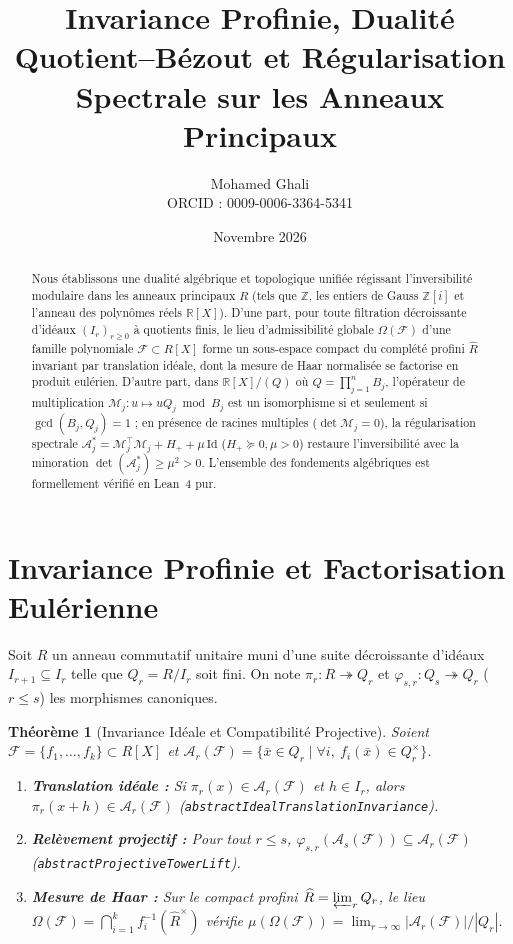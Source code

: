 \documentclass[11pt,a4paper]{article}
\title{\textbf{Invariance Profinie, Dualité Quotient--Bézout et Régularisation Spectrale sur les Anneaux Principaux}}
\author{Mohamed Ghali \\ \small ORCID : 0009-0006-3364-5341}
\date{Novembre 2026}
\newtheorem{theorem}{Théorème}[section]
\begin{document}
\maketitle

\begin{abstract}
Nous établissons une dualité algébrique et topologique unifiée régissant l'inversibilité modulaire dans les anneaux principaux $R$ (tels que $\mathbb{Z}$, les entiers de Gauss $\mathbb{Z}[i]$ et l'anneau des polynômes réels $\mathbb{R}[X]$). D'une part, pour toute filtration décroissante d'idéaux $(I_r)_{r \ge 0}$ à quotients finis, le lieu d'admissibilité globale $\Omega(\mathcal{F})$ d'une famille polynomiale $\mathcal{F} \subset R[X]$ forme un sous-espace compact du complété profini $\widehat{R}$ invariant par translation idéale, dont la mesure de Haar normalisée se factorise en produit eulérien. D'autre part, dans $\mathbb{R}[X]/(Q)$ où $Q = \prod_{j=1}^n B_j$, l'opérateur de multiplication $\mathcal{M}_j : u \mapsto u Q_j \bmod B_j$ est un isomorphisme si et seulement si $\gcd(B_j, Q_j) = 1$ ; en présence de racines multiples ($\det \mathcal{M}_j = 0$), la régularisation spectrale $\mathcal{A}_j^* = \mathcal{M}_j^\top \mathcal{M}_j + H_+ + \mu\,\mathrm{Id}$ ($H_+ \succeq 0, \mu > 0$) restaure l'inversibilité avec la minoration $\det(\mathcal{A}_j^*) \ge \mu^2 > 0$. L'ensemble des fondements algébriques est formellement vérifié en Lean~4 pur.
\end{abstract}

\section{Invariance Profinie et Factorisation Eulérienne}

Soit $R$ un anneau commutatif unitaire muni d'une suite décroissante d'idéaux $I_{r+1} \subseteq I_r$ telle que $Q_r = R/I_r$ soit fini. On note $\pi_r : R \twoheadrightarrow Q_r$ et $\varphi_{s,r} : Q_s \twoheadrightarrow Q_r$ ($r \le s$) les morphismes canoniques.

\begin{theorem}[Invariance Idéale et Compatibilité Projective]
Soient $\mathcal{F} = \{f_1, \dots, f_k\} \subset R[X]$ et $\mathcal{A}_r(\mathcal{F}) = \{ \bar{x} \in Q_r \mid \forall i,\ f_i(\bar{x}) \in Q_r^\times \}$.
\begin{enumerate}
    \item \textbf{Translation idéale :} Si $\pi_r(x) \in \mathcal{A}_r(\mathcal{F})$ et $h \in I_r$, alors $\pi_r(x + h) \in \mathcal{A}_r(\mathcal{F})$ (\texttt{abstractIdealTranslationInvariance}).
    \item \textbf{Relèvement projectif :} Pour tout $r \le s$, $\varphi_{s,r}(\mathcal{A}_s(\mathcal{F})) \subseteq \mathcal{A}_r(\mathcal{F})$ (\texttt{abstractProjectiveTowerLift}).
    \item \textbf{Mesure de Haar :} Sur le compact profini $\widehat{R} = \varprojlim_r Q_r$, le lieu $\Omega(\mathcal{F}) = \bigcap_{i=1}^k f_i^{-1}(\widehat{R}^\times)$ vérifie $\mu(\Omega(\mathcal{F})) = \lim_{r \to \infty} |\mathcal{A}_r(\mathcal{F})| / |Q_r|$.
\end{enumerate}
\end{theorem}
\end{document}
